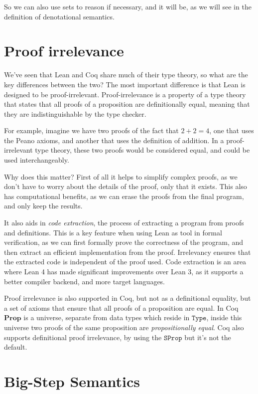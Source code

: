 \documentclass[
  a4paper, 
  10pt, 
  parskip=half, 
  DIV=20,
  toc=bibliography,
  usegeometry,
]{scrartcl}
\newcommand{\Prop}{\mathbf{Prop}}
\begin{document}
So we can also use sets to reason if necessary, and it will be, as we will see
in the definition of denotational semantics.

\section{Proof irrelevance}

We've seen that Lean and Coq share much of their type theory, so what are the
key differences between the two? The most important difference is that Lean is
designed to be proof-irrelevant. Proof-irrelevance is a property of a type
theory that states that all proofs of a proposition are definitionally equal,
meaning that they are indistinguishable by the type checker.

For example, imagine we have two proofs of the fact that \(2 + 2 = 4\), one that
uses the Peano axioms, and another that uses the definition of addition. In a
proof-irrelevant type theory, these two proofs would be considered equal, and
could be used interchangeably.

Why does this matter? First of all it helps to simplify complex proofs, as we
don't have to worry about the details of the proof, only that it exists. This
also has computational benefits, as we can erase the proofs from the final
program, and only keep the results.

It also aids in \emph{code extraction}, the process of extracting a program from
proofs and definitions. This is a key feature when using Lean as tool in formal
verification, as we can first formally prove the correctness of the program, and
then extract an efficient implementation from the proof. Irrelevancy ensures
that the extracted code is independent of the proof used. Code extraction is
an area where Lean 4 has made significant improvements over Lean 3, as it
supports a better compiler backend, and more target languages.

Proof irrelevance is also supported in Coq, but not as a definitional equality,
but a set of axioms that ensure that all proofs of a proposition are equal. In
Coq \(\Prop\) is a universe, separate from data types which reside in
\(\texttt{Type}\), inside this universe two proofs of the same proposition are
\emph{propositionally equal}. Coq also supports definitional proof irrelevance, by
using the \(\texttt{SProp}\) but it's not the default.

\section{Big-Step Semantics}
\end{document}
